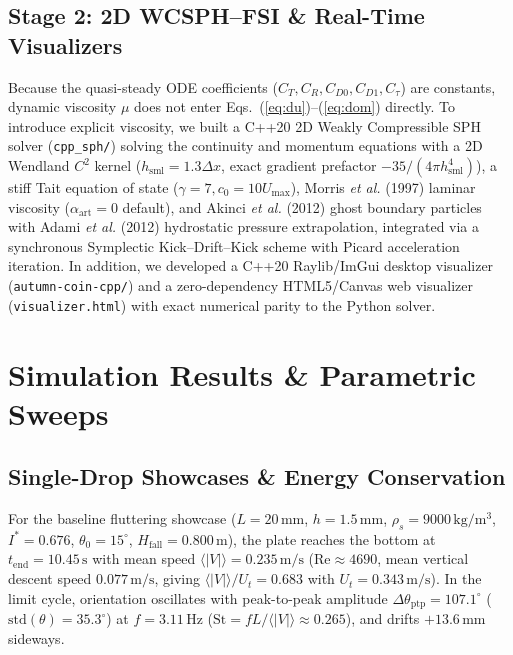 \documentclass[10pt,a4paper,twocolumn]{article}
\begin{document}
\subsection{Stage 2: 2D WCSPH--FSI & Real-Time Visualizers}
Because the quasi-steady ODE coefficients ($C_T, C_R, C_{D0}, C_{D1}, C_\tau$) are constants, dynamic viscosity $\mu$ does not enter Eqs.~(\ref{eq:du})--(\ref{eq:dom}) directly. To introduce explicit viscosity, we built a C++20 2D Weakly Compressible SPH solver (\texttt{cpp\_sph/}) solving the continuity and momentum equations with a 2D Wendland $C^2$ kernel ($h_{\mathrm{sml}} = 1.3\Delta x$, exact gradient prefactor $-35/(4\pi h_{\mathrm{sml}}^4)$), a stiff Tait equation of state ($\gamma = 7, c_0 = 10 U_{\max}$), Morris \textit{et al.} (1997) laminar viscosity ($\alpha_{\mathrm{art}} = 0$ default), and Akinci \textit{et al.} (2012) ghost boundary particles with Adami \textit{et al.} (2012) hydrostatic pressure extrapolation, integrated via a synchronous Symplectic Kick--Drift--Kick scheme with Picard acceleration iteration. In addition, we developed a C++20 Raylib/ImGui desktop visualizer (\texttt{autumn-coin-cpp/}) and a zero-dependency HTML5/Canvas web visualizer (\texttt{visualizer.html}) with exact numerical parity to the Python solver.

\section{Simulation Results \& Parametric Sweeps}
\label{sec:results}

\subsection{Single-Drop Showcases & Energy Conservation}
For the baseline fluttering showcase ($L = 20\,\mathrm{mm}$, $h = 1.5\,\mathrm{mm}$, $\rho_s = 9000\,\mathrm{kg/m^3}$, $I^* = 0.676$, $\theta_0 = 15^\circ$, $H_{\mathrm{fall}} = 0.800\,\mathrm{m}$), the plate reaches the bottom at $t_{\mathrm{end}} = 10.45\,\mathrm{s}$ with mean speed $\langle |V| \rangle = 0.235\,\mathrm{m/s}$ ($\mathrm{Re} \approx 4690$, mean vertical descent speed $0.077\,\mathrm{m/s}$, giving $\langle |V| \rangle / U_t = 0.683$ with $U_t = 0.343\,\mathrm{m/s}$). In the limit cycle, orientation oscillates with peak-to-peak amplitude $\Delta\theta_{\mathrm{ptp}} = 107.1^\circ$ ($\mathrm{std}(\theta) = 35.3^\circ$) at $f = 3.11\,\mathrm{Hz}$ ($\mathrm{St} = f L / \langle |V| \rangle \approx 0.265$), and drifts $+13.6\,\mathrm{mm}$ sideways.
\end{document}
